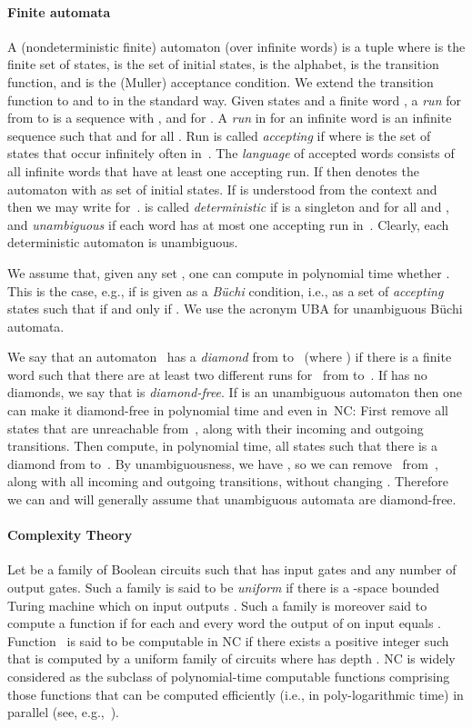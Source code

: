 \documentclass{elsarticle}
\begin{document}
\paragraph*{Finite automata}
A (nondeterministic finite) automaton (over infinite words)
is a tuple 
where  is the finite set of states,  is the set of initial
states,  is the alphabet,
 is
the transition function, and  is the (Muller) acceptance condition.
We extend the transition function to 
and to  in the standard way.
Given states  and a finite word
,
a \emph{run} for  from  to  is a sequence
 with ,  and
 for .
A \emph{run} in  for an infinite word
 is an infinite sequence
 such that  and
 for all .  Run  is
called \emph{accepting} if  where
 is the set of states that occur infinitely
often in~.  The \emph{language}  of accepted words
consists of all infinite words  that have at
least one accepting run.
If  then  denotes the automaton  with 
as set of initial states.  If  is understood from the context and
 then we may write  for~.
 is called  \emph{deterministic} if  is a singleton and    for all  and , and \emph{unambiguous} if each word  has at most one accepting run in~.
Clearly, each deterministic automaton is unambiguous.

We assume that, given any set , one can compute in
polynomial time whether .  This is the case, e.g., if
 is given as a \emph{B\"uchi} condition, i.e., as a set
 of \emph{accepting} states such that  if
and only if .
We use the acronym UBA for unambiguous B\"uchi automata.

We say that an automaton~ has a \emph{diamond} from  to~
(where ) if there is a finite word  such
that there are at least two different runs for~ from  to~.
If  has no diamonds, we say that  is \emph{diamond-free}.
If  is an unambiguous automaton then one can make it diamond-free
in polynomial time and even in~NC: First remove all states that are unreachable
from~, along with their incoming and outgoing transitions.  Then
compute, in polynomial time, all states  such that there is a
diamond from  to~.  By unambiguousness, we have
, so we can remove~ from~, along with all
incoming and outgoing transitions, without changing .
Therefore we can and will generally assume that unambiguous automata are diamond-free.

\paragraph*{Complexity Theory}

Let  be a family of Boolean circuits such
that  has  input gates and any number of output gates.  Such a
family is said to be \emph{uniform} if there is a -space
bounded Turing machine which on input  outputs .  Such a
family is moreover said to compute a function
 if for each  and
every word  the output of  on input  equals
.
Function~ is said to be computable in NC if there exists a
positive integer  such that  is computed by a uniform family
of circuits  where  has depth
.  NC is widely considered as the subclass of
polynomial-time computable functions comprising those functions that
can be computed efficiently (i.e., in poly-logarithmic time) in
parallel (see, e.g.,~\cite[Chapter 15]{Pap94}).
\end{document}
